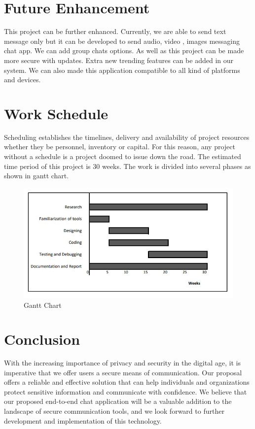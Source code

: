 \section{Future Enhancement}
This project can be further enhanced. Currently, we are able to send text message only but it can be developed to
send audio, video , images messaging chat app. We can add group chats options. As well as this project can be made more
secure with updates. Extra new trending features can be added in our system. We can also made this application compatible to all kind
of platforms and devices.

\section{Work Schedule}
Scheduling establishes the timelines, delivery and availability of project
resources whether they be personnel, inventory or capital. For this reason,
any project without a schedule is a project doomed to issue down the road.
The estimated time period of this project is 30 weeks. The work is divided into several
phases as shown in gantt chart.

\begin{figure}[H]
	\centering
	\includegraphics[width=160mm]{images/ganttchart.png.jpg}
	\caption{Gantt Chart} %
	\label{figganttchart} %
\end{figure}

\section{Conclusion}

With the increasing importance of privacy and security in the digital age, it is imperative that we offer users a secure means of
communication. Our proposal offers a reliable and effective solution that can help individuals and organizations protect sensitive
information and communicate with confidence. We believe that our proposed end-to-end chat application will be a valuable addition
to the landscape of secure communication tools, and we look forward to further development and implementation of this technology.



